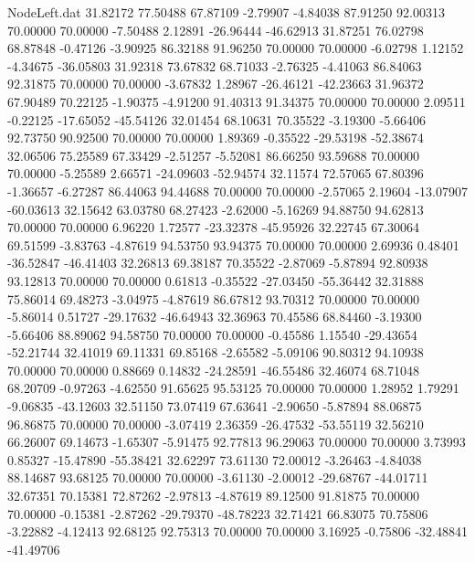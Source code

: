 \begin{filecontents}{NodeLeft.dat}
  31.82172   77.50488   67.87109    -2.79907   -4.84038   87.91250   92.00313   70.00000   70.00000   -7.50488    2.12891  -26.96444  -46.62913
  31.87251   76.02798   68.87848    -0.47126   -3.90925   86.32188   91.96250   70.00000   70.00000   -6.02798    1.12152   -4.34675  -36.05803
  31.92318   73.67832   68.71033    -2.76325   -4.41063   86.84063   92.31875   70.00000   70.00000   -3.67832    1.28967  -26.46121  -42.23663
  31.96372   67.90489   70.22125    -1.90375   -4.91200   91.40313   91.34375   70.00000   70.00000    2.09511   -0.22125  -17.65052  -45.54126
  32.01454   68.10631   70.35522    -3.19300   -5.66406   92.73750   90.92500   70.00000   70.00000    1.89369   -0.35522  -29.53198  -52.38674
  32.06506   75.25589   67.33429    -2.51257   -5.52081   86.66250   93.59688   70.00000   70.00000   -5.25589    2.66571  -24.09603  -52.94574
  32.11574   72.57065   67.80396    -1.36657   -6.27287   86.44063   94.44688   70.00000   70.00000   -2.57065    2.19604  -13.07907  -60.03613
  32.15642   63.03780   68.27423    -2.62000   -5.16269   94.88750   94.62813   70.00000   70.00000    6.96220    1.72577  -23.32378  -45.95926
  32.22745   67.30064   69.51599    -3.83763   -4.87619   94.53750   93.94375   70.00000   70.00000    2.69936    0.48401  -36.52847  -46.41403
  32.26813   69.38187   70.35522    -2.87069   -5.87894   92.80938   93.12813   70.00000   70.00000    0.61813   -0.35522  -27.03450  -55.36442
  32.31888   75.86014   69.48273    -3.04975   -4.87619   86.67812   93.70312   70.00000   70.00000   -5.86014    0.51727  -29.17632  -46.64943
  32.36963   70.45586   68.84460    -3.19300   -5.66406   88.89062   94.58750   70.00000   70.00000   -0.45586    1.15540  -29.43654  -52.21744
  32.41019   69.11331   69.85168    -2.65582   -5.09106   90.80312   94.10938   70.00000   70.00000    0.88669    0.14832  -24.28591  -46.55486
  32.46074   68.71048   68.20709    -0.97263   -4.62550   91.65625   95.53125   70.00000   70.00000    1.28952    1.79291   -9.06835  -43.12603
  32.51150   73.07419   67.63641    -2.90650   -5.87894   88.06875   96.86875   70.00000   70.00000   -3.07419    2.36359  -26.47532  -53.55119
  32.56210   66.26007   69.14673    -1.65307   -5.91475   92.77813   96.29063   70.00000   70.00000    3.73993    0.85327  -15.47890  -55.38421
  32.62297   73.61130   72.00012    -3.26463   -4.84038   88.14687   93.68125   70.00000   70.00000   -3.61130   -2.00012  -29.68767  -44.01711
  32.67351   70.15381   72.87262    -2.97813   -4.87619   89.12500   91.81875   70.00000   70.00000   -0.15381   -2.87262  -29.79370  -48.78223
  32.71421   66.83075   70.75806    -3.22882   -4.12413   92.68125   92.75313   70.00000   70.00000    3.16925   -0.75806  -32.48841  -41.49706

\end{filecontents}
